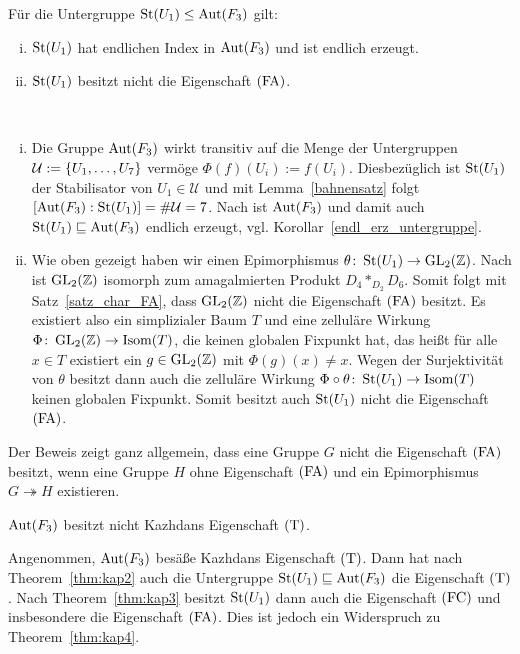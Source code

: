 \begin{theo}
\label{thm:kap4}
	Für die Untergruppe $\operatorname{St}(U_1) \leq \operatorname{Aut}(F_3)$ gilt:
	\begin{enumerate}[(i)]
		\item $\operatorname{St}(U_1)$ hat endlichen Index in $\operatorname{Aut}(F_3)$ und ist endlich erzeugt.
		\item $\operatorname{St}(U_1)$ besitzt nicht die Eigenschaft $\operatorname{(FA)}$.
	\end{enumerate}
\end{theo}

\begin{beweis}
	\mbox{} \\[-.85cm]
	\begin{enumerate}[(i)]
		\item Die Gruppe $\operatorname{Aut}(F_3)$ wirkt transitiv auf die Menge der Untergruppen $\mathcal{U} := \{U_1,\dots,U_7\}$ vermöge $\Phi(f)(U_i) := f(U_i)$. Diesbezüglich ist $\operatorname{St}(U_1)$ der Stabilisator von $U_1 \in \mathcal{U}$ und mit Lemma~\ref{bahnensatz} folgt $\left\lbrack\operatorname{Aut}(F_3) : \operatorname{St}(U_1)\right\rbrack = \#\mathcal{U} = 7$. 
		Nach \cite[Prop. 1.1.2]{Olga} ist $\operatorname{Aut}(F_3)$ und damit auch $\operatorname{St}(U_1) \sqsubseteq \operatorname{Aut}(F_3)$ endlich erzeugt, vgl. Korollar~\ref{endl_erz_untergruppe}. 
		\item Wie oben gezeigt haben wir einen Epimorphismus $\theta \colon \operatorname{St}(U_1) \rightarrow \operatorname{GL}_2(\mathbb{Z})$. Nach \cite[Theorem 23.1]{Zieschang} ist $\operatorname{GL}_2(\mathbb{Z})$ isomorph zum amagalmierten Produkt $D_4 *_{D_2} D_6$. Somit folgt mit Satz~\ref{satz_char_FA}, dass $\operatorname{GL}_2(\mathbb{Z})$ nicht die Eigenschaft $\operatorname{(FA)}$ besitzt. Es existiert also ein simplizialer Baum $T$ und eine zelluläre Wirkung $\Phi\colon \operatorname{GL}_2(\mathbb{Z}) \rightarrow \operatorname{Isom}(T)$, die keinen globalen Fixpunkt hat, das heißt für alle $x \in T$ existiert ein $g \in \operatorname{GL}_2(\mathbb{Z})$ mit $\Phi(g)(x) \neq x$. Wegen der Surjektivität von $\theta$ besitzt dann auch die zelluläre Wirkung $\Phi \circ \theta\colon \operatorname{St}(U_1) \rightarrow \operatorname{Isom}(T)$ keinen globalen Fixpunkt. Somit besitzt auch $\operatorname{St}(U_1)$ nicht die Eigenschaft $\operatorname{(FA)}$. \qedhere
	\end{enumerate}	
\end{beweis}

\begin{bemerkung}
	Der Beweis zeigt ganz allgemein, dass eine Gruppe $G$ nicht die Eigenschaft $\operatorname{(FA)}$ besitzt, wenn eine Gruppe $H$ ohne Eigenschaft $\operatorname{(FA)}$ und ein Epimorphismus $G \twoheadrightarrow H$ existieren.
\end{bemerkung}

\begin{korollar}
	$\operatorname{Aut}(F_3)$ besitzt nicht Kazhdans Eigenschaft $\operatorname{(T)}$.
\end{korollar}

\begin{beweis}
	Angenommen, $\operatorname{Aut}(F_3)$ besäße Kazhdans Eigenschaft $\operatorname{(T)}$. Dann hat nach Theorem~\ref{thm:kap2} auch die Untergruppe $\operatorname{St}(U_1) \sqsubseteq \operatorname{Aut}(F_3)$ die Eigenschaft $\operatorname{(T)}$. Nach Theorem~\ref{thm:kap3} besitzt $\operatorname{St}(U_1)$ dann auch die Eigenschaft $\operatorname{(FC)}$ und insbesondere die Eigenschaft $\operatorname{(FA)}$. Dies ist jedoch ein Widerspruch zu Theorem~\ref{thm:kap4}. \qedhere
\end{beweis}

\cleardoubleoddemptypage